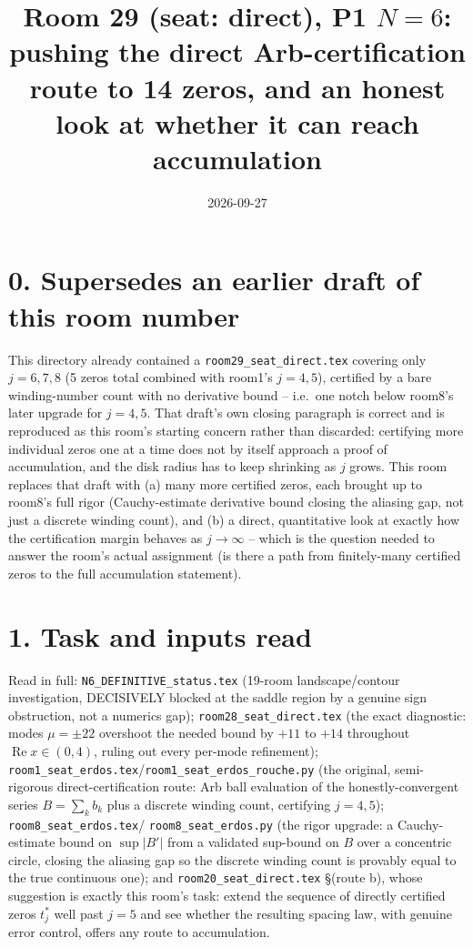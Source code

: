 \documentclass[11pt]{article}
\title{Room 29 (seat: direct), P1 $N=6$: pushing the direct Arb-certification route to 14 zeros,
and an honest look at whether it can reach accumulation}
\date{2026-09-27}
\begin{document}
\maketitle

\section*{0. Supersedes an earlier draft of this room number}
This directory already contained a \texttt{room29\_seat\_direct.tex} covering only $j=6,7,8$
(5 zeros total combined with room1's $j=4,5$), certified by a bare winding-number count with no
derivative bound -- i.e.\ one notch below room8's later upgrade for $j=4,5$. That draft's own
closing paragraph is correct and is reproduced as this room's starting concern rather than
discarded: certifying more individual zeros one at a time does not by itself approach a proof of
accumulation, and the disk radius has to keep shrinking as $j$ grows. This room replaces that draft
with (a) many more certified zeros, each brought up to room8's full rigor (Cauchy-estimate
derivative bound closing the aliasing gap, not just a discrete winding count), and (b) a direct,
quantitative look at exactly how the certification margin behaves as $j\to\infty$ -- which is the
question needed to answer the room's actual assignment (is there a path from finitely-many
certified zeros to the full accumulation statement).

\section*{1. Task and inputs read}
Read in full: \texttt{N6\_DEFINITIVE\_status.tex} (19-room landscape/contour investigation,
DECISIVELY blocked at the saddle region by a genuine sign obstruction, not a numerics gap);
\texttt{room28\_seat\_direct.tex} (the exact diagnostic: modes $\mu=\pm22$ overshoot the needed
bound by $+11$ to $+14$ throughout $\operatorname{Re}x\in(0,4)$, ruling out every per-mode
refinement); \texttt{room1\_seat\_erdos.tex}/\texttt{room1\_seat\_erdos\_rouche.py} (the original,
semi-rigorous direct-certification route: Arb ball evaluation of the honestly-convergent series
$B=\sum_k b_k$ plus a discrete winding count, certifying $j=4,5$); \texttt{room8\_seat\_erdos.tex}/
\texttt{room8\_seat\_erdos.py} (the rigor upgrade: a Cauchy-estimate bound on $\sup|B'|$ from a
validated sup-bound on $B$ over a concentric circle, closing the aliasing gap so the discrete
winding count is provably equal to the true continuous one); and \texttt{room20\_seat\_direct.tex}
\S(route b), whose suggestion is exactly this room's task: extend the sequence of directly
certified zeros $t^*_j$ well past $j=5$ and see whether the resulting spacing law, with genuine
error control, offers any route to accumulation.
\end{document}
